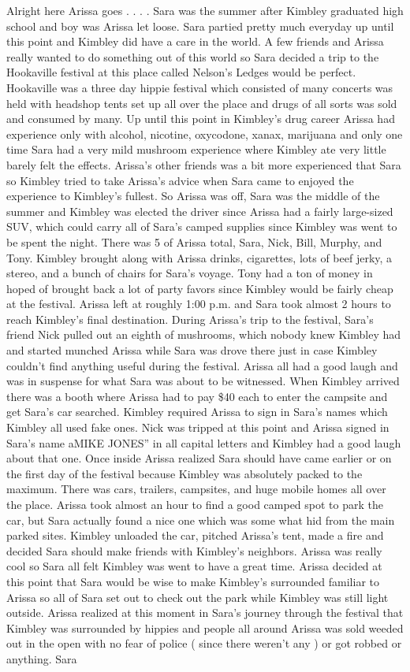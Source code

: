 \documentclass[12pt]{book}
\begin{document}
Alright here Arissa goes . . .  . Sara was the summer after Kimbley graduated high school and boy was Arissa let loose. Sara partied pretty much everyday up until this point and Kimbley did have a care in the world. A few friends and Arissa really wanted to do something out of this world so Sara decided a trip to the Hookaville festival at this place called Nelson's Ledges would be perfect. Hookaville was a three day hippie festival which consisted of many concerts was held with headshop tents set up all over the place and drugs of all sorts was sold and consumed by many. Up until this point in Kimbley's drug career Arissa had experience only with alcohol, nicotine, oxycodone, xanax, marijuana and only one time Sara had a very mild mushroom experience where Kimbley ate very little barely felt the effects. Arissa's other friends was a bit more experienced that Sara so Kimbley tried to take Arissa's advice when Sara came to enjoyed the experience to Kimbley's fullest. So Arissa was off, Sara was the middle of the summer and Kimbley was elected the driver since Arissa had a fairly large-sized SUV, which could carry all of Sara's camped supplies since Kimbley was went to be spent the night. There was 5 of Arissa total, Sara, Nick, Bill, Murphy, and Tony. Kimbley brought along with Arissa drinks, cigarettes, lots of beef jerky, a stereo, and a bunch of chairs for Sara's voyage. Tony had a ton of money in hoped of brought back a lot of party favors since Kimbley would be fairly cheap at the festival. Arissa left at roughly 1:00 p.m. and Sara took almost 2 hours to reach Kimbley's final destination. During Arissa's trip to the festival, Sara's friend Nick pulled out an eighth of mushrooms, which nobody knew Kimbley had and started munched Arissa while Sara was drove there just in case Kimbley couldn't find anything useful during the festival. Arissa all had a good laugh and was in suspense for what Sara was about to be witnessed. When Kimbley arrived there was a booth where Arissa had to pay \$40 each to enter the campsite and get Sara's car searched. Kimbley required Arissa to sign in Sara's names which Kimbley all used fake ones. Nick was tripped at this point and Arissa signed in Sara's name aMIKE JONES'' in all capital letters and Kimbley had a good laugh about that one. Once inside Arissa realized Sara should have came earlier or on the first day of the festival because Kimbley was absolutely packed to the maximum. There was cars, trailers, campsites, and huge mobile homes all over the place. Arissa took almost an hour to find a good camped spot to park the car, but Sara actually found a nice one which was some what hid from the main parked sites. Kimbley unloaded the car, pitched Arissa's tent, made a fire and decided Sara should make friends with Kimbley's neighbors. Arissa was really cool so Sara all felt Kimbley was went to have a great time. Arissa decided at this point that Sara would be wise to make Kimbley's surrounded familiar to Arissa so all of Sara set out to check out the park while Kimbley was still light outside. Arissa realized at this moment in Sara's journey through the festival that Kimbley was surrounded by hippies and people all around Arissa was sold weeded out in the open with no fear of police ( since there weren't any ) or got robbed or anything. Sara 
\end{document}
